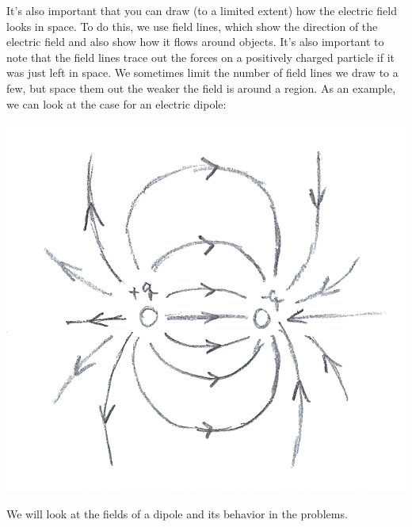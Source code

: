 It's also important that you can draw (to a limited extent) how the electric field looks in space. To do this, we use field lines, which show the direction of the electric field and also show how it flows around objects. It's also important to note that the field lines trace out the forces on a positively charged particle if it was just left in space. We sometimes limit the number of field lines we draw to a few, but space them out the weaker the field is around a region. As an example, we can look at the case for an electric dipole:
\begin{center}
	\includegraphics[scale=0.3]{images/em/dipolefield.png}
\end{center}
We will look at the fields of a dipole and its behavior in the problems. 
